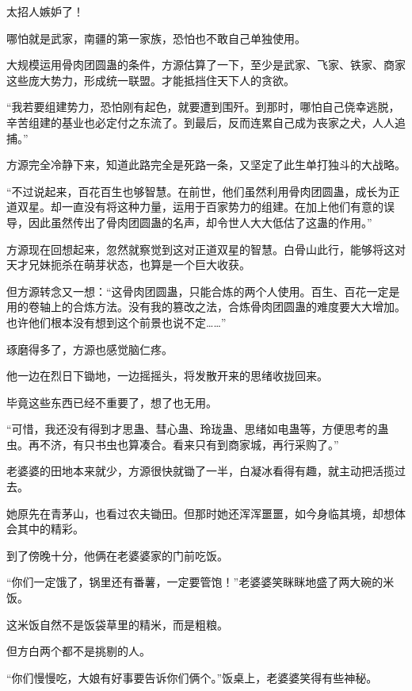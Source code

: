 \begin{this_body}
太招人嫉妒了！

哪怕就是武家，南疆的第一家族，恐怕也不敢自己单独使用。

大规模运用骨肉团圆蛊的条件，方源估算了一下，至少是武家、飞家、铁家、商家这些庞大势力，形成统一联盟。才能抵挡住天下人的贪欲。

“我若要组建势力，恐怕刚有起色，就要遭到围歼。到那时，哪怕自己侥幸逃脱，辛苦组建的基业也必定付之东流了。到最后，反而连累自己成为丧家之犬，人人追捕。”

方源完全冷静下来，知道此路完全是死路一条，又坚定了此生单打独斗的大战略。

“不过说起来，百花百生也够智慧。在前世，他们虽然利用骨肉团圆蛊，成长为正道双星。却一直没有将这种力量，运用于百家势力的组建。在加上他们有意的误导，因此虽然传出了骨肉团圆蛊的名声，却令世人大大低估了这蛊的作用。”

方源现在回想起来，忽然就察觉到这对正道双星的智慧。白骨山此行，能够将这对天才兄妹扼杀在萌芽状态，也算是一个巨大收获。

但方源转念又一想：“这骨肉团圆蛊，只能合炼的两个人使用。百生、百花一定是用的卷轴上的合炼方法。没有我的篡改之法，合炼骨肉团圆蛊的难度要大大增加。也许他们根本没有想到这个前景也说不定……”

琢磨得多了，方源也感觉脑仁疼。

他一边在烈日下锄地，一边摇摇头，将发散开来的思绪收拢回来。

毕竟这些东西已经不重要了，想了也无用。

“可惜，我还没有得到才思蛊、彗心蛊、玲珑蛊、思绪如电蛊等，方便思考的蛊虫。再不济，有只书虫也算凑合。看来只有到商家城，再行采购了。”

老婆婆的田地本来就少，方源很快就锄了一半，白凝冰看得有趣，就主动把活揽过去。

她原先在青茅山，也看过农夫锄田。但那时她还浑浑噩噩，如今身临其境，却想体会其中的精彩。

到了傍晚十分，他俩在老婆婆家的门前吃饭。

“你们一定饿了，锅里还有番薯，一定要管饱！”老婆婆笑眯眯地盛了两大碗的米饭。

这米饭自然不是饭袋草里的精米，而是粗粮。

但方白两个都不是挑剔的人。

“你们慢慢吃，大娘有好事要告诉你们俩个。”饭桌上，老婆婆笑得有些神秘。

\end{this_body}

